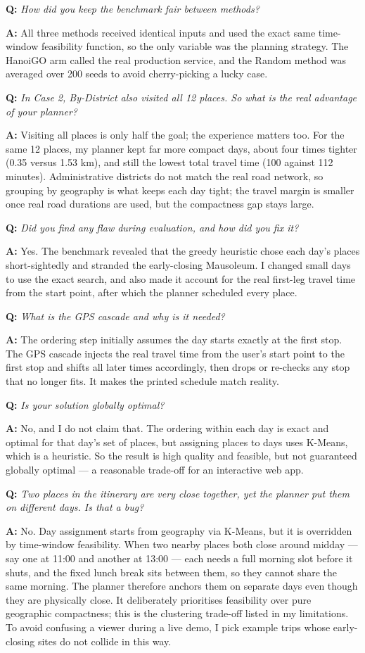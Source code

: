 \documentclass[12pt,a4paper]{article}
\newcommand{\Q}[1]{\medskip\noindent\textbf{Q:} \textit{#1}\par}
\newcommand{\A}{\noindent\textbf{A:} }
\begin{document}
\Q{How did you keep the benchmark fair between methods?}
\A All three methods received identical inputs and used the exact same
time-window feasibility function, so the only variable was the planning strategy.
The HanoiGO arm called the real production service, and the Random method was
averaged over 200 seeds to avoid cherry-picking a lucky case.

\Q{In Case 2, By-District also visited all 12 places. So what is the real
advantage of your planner?}
\A Visiting all places is only half the goal; the experience matters too. For the
same 12 places, my planner kept far more compact days, about four times tighter
(0.35 versus 1.53 km), and still the lowest total travel time (100 against 112
minutes). Administrative districts do not match the real road network, so grouping
by geography is what keeps each day tight; the travel margin is smaller once real
road durations are used, but the compactness gap stays large.

\Q{Did you find any flaw during evaluation, and how did you fix it?}
\A Yes. The benchmark revealed that the greedy heuristic chose each day's places
short-sightedly and stranded the early-closing Mausoleum. I changed small days to
use the exact search, and also made it account for the real first-leg travel time
from the start point, after which the planner scheduled every place.

\Q{What is the GPS cascade and why is it needed?}
\A The ordering step initially assumes the day starts exactly at the first stop.
The GPS cascade injects the real travel time from the user's start point to the
first stop and shifts all later times accordingly, then drops or re-checks any
stop that no longer fits. It makes the printed schedule match reality.

\Q{Is your solution globally optimal?}
\A No, and I do not claim that. The ordering within each day is exact and optimal
for that day's set of places, but assigning places to days uses K-Means, which is
a heuristic. So the result is high quality and feasible, but not guaranteed
globally optimal --- a reasonable trade-off for an interactive web app.

\Q{Two places in the itinerary are very close together, yet the planner put them
on different days. Is that a bug?}
\A No. Day assignment starts from geography via K-Means, but it is overridden by
time-window feasibility. When two nearby places both close around midday --- say
one at 11:00 and another at 13:00 --- each needs a full morning slot before it
shuts, and the fixed lunch break sits between them, so they cannot share the same
morning. The planner therefore anchors them on separate days even though they are
physically close. It deliberately prioritises feasibility over pure geographic
compactness; this is the clustering trade-off listed in my limitations. To avoid
confusing a viewer during a live demo, I pick example trips whose early-closing
sites do not collide in this way.
\end{document}
